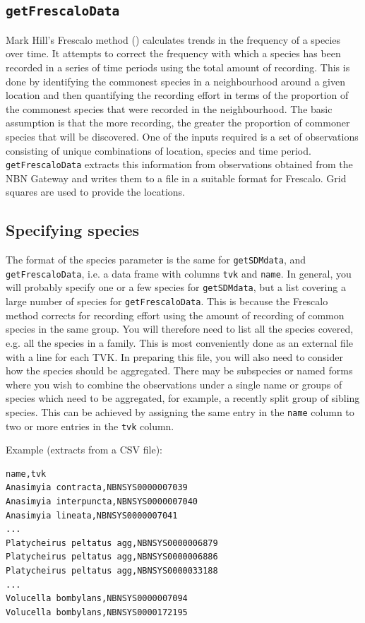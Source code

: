 \documentclass{article}
\begin{document}
\subsection{\texttt{getFrescaloData}}
Mark Hill's Frescalo method (\cite{Hill2012}) calculates trends in the frequency
of a species over time. It attempts to correct the frequency with which a
species has been recorded in a series of time periods using the total amount
of recording. This is done by identifying the commonest species in a 
neighbourhood around a given location and then quantifying the recording effort
in terms of the proportion of the commonest species that were recorded in the
neighbourhood. The basic assumption is that the more recording, the greater the
proportion of commoner species that will be discovered. One of the inputs 
required is a set of observations consisting of unique combinations of location,
species and time period. \texttt{getFrescaloData} extracts this information from
observations obtained from the NBN Gateway and writes them to a file in a
suitable format for Frescalo. Grid squares are used to provide the locations.

\subsection{Specifying species}
The format of the species parameter is the same for \texttt{getSDMdata},
and \texttt{getFrescaloData}, i.e. a data frame with columns \texttt{tvk} and
\texttt{name}. In general, you will probably specify one or a few species for
\texttt{getSDMdata},
but a list covering a large number of species for \texttt{getFrescaloData}. This is
because the Frescalo method corrects for recording effort using the amount of
recording of common species in the same group. You will therefore need to list
all the species covered, e.g. all the species in a family. This is most 
conveniently done as an external file with a line for each TVK. In preparing this
file, you will also need to consider how the species should be aggregated. There
may be subspecies or named forms where you wish to combine 
the observations under a single name or groups of species which need to be 
aggregated, for example, a recently split group of sibling species. This can be 
achieved by assigning the same entry in the \texttt{name} column to two or 
more entries in the \texttt{tvk} column. 

Example (extracts from a CSV file):
 
\begin{verbatim}
name,tvk
Anasimyia contracta,NBNSYS0000007039
Anasimyia interpuncta,NBNSYS0000007040
Anasimyia lineata,NBNSYS0000007041
...
Platycheirus peltatus agg,NBNSYS0000006879
Platycheirus peltatus agg,NBNSYS0000006886
Platycheirus peltatus agg,NBNSYS0000033188
...
Volucella bombylans,NBNSYS0000007094
Volucella bombylans,NBNSYS0000172195
\end{verbatim}
\end{document}
